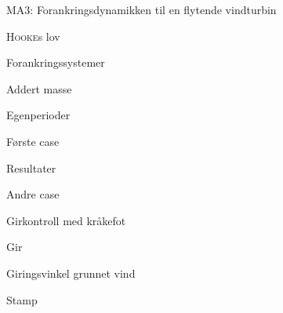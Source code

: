 \documentclass[gray]{beamer}
\begin{document}
\begin{frame}{MA3: Forankringsdynamikken til en flytende vindturbin}
  
\end{frame}

\begin{frame}{\textsc{Hooke}s lov}
  
\end{frame}

\begin{frame}{Forankringssystemer}
  
\end{frame}

\begin{frame}{Addert masse}
  
\end{frame}

\begin{frame}{Egenperioder}
  
\end{frame}

\begin{frame}{Første case}
  
\end{frame}
\begin{frame}{Resultater}
  
\end{frame}

\begin{frame}{Andre case}
  
\end{frame}

\begin{frame}{Girkontroll med kråkefot}
  
\end{frame}

\begin{frame}{Gir}
  
\end{frame}

\begin{frame}{Giringsvinkel grunnet vind}
  
\end{frame}

\begin{frame}{Stamp}
  
\end{frame}

\begin{frame}[allowframebreaks]
  \printbibliography
\end{frame}
\end{document}
